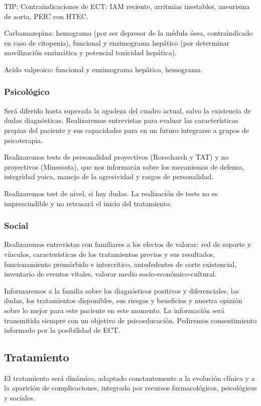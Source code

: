 TIP: Contraindicaciones de ECT: IAM reciente, arritmias inestables, aneurisma de aorta, PEIC con HTEC.

Carbamazepina: hemograma (por ser depresor de la médula ósea, contraindicado en caso de citopenia), funcional y enzimograma hepático (por determinar movilización enzimática y potencial toxicidad hepática).

Acido valproico: funcional y enzimograma hepático, hemograma.
\subsubsection*{Psicológico}
Será diferido hasta superada la agudeza del cuadro actual, salvo la existencia de dudas diagnósticas. Realizaremos entrevistas para evaluar las características propias del paciente y sus capacidades para en un futuro integrarse a grupos de psicoterapia.

Realizaremos tests de personalidad proyectivos (Rorscharch y TAT) y no proyectivos (Minessota), que nos informarán sobre los mecanismos de defensa, integridad yoica, manejo de la agresividad y rasgos de personalidad.

Realizaremos test de nivel, si hay dudas. La realización de tests no es imprescindible y no retrasará el inicio del tratamiento.
\subsubsection*{Social}
Realizaremos entrevistas con familiares a los efectos de valorar: red de soporte y vínculos, características de los tratamientos previos y sus resultados, funcionamiento premórbido e intercrítico, antededentes de corte existencial, inventario de eventos vitales, valorar medio socio-económico-cultural.

Informaremos a la familia sobre los diagnósticos positivos y diferenciales, las dudas, los tratamientos disponibles, sus riesgos y beneficios y nuestra opinión sobre lo mejor para este paciente en este momento. La información será transmitida siempre con un objetivo de psicoeducación. Pediremos consentimiento informado por la posibilidad de ECT.
\subsection*{Tratamiento}
El tratamiento será dinámico, adaptado constantemente a la evolución clínica y a la aparición de complicaciones, integrado por recursos farmacológicos, psicológicos y sociales\cite{yatham2018canadian}.


